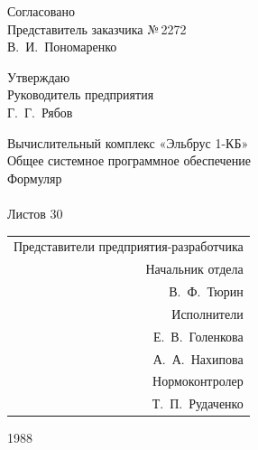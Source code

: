 \documentclass[11pt,a4paper]{article}
\begin{document}
\begin{titlepage}\small
\noindent\begin{minipage}[t]{0.45\linewidth}Согласовано\\Представитель заказчика №\,2272\\В.~И.~Пономаренко\end{minipage}\hfill\begin{minipage}[t]{0.45\linewidth}\raggedleft Утверждаю\\Руководитель предприятия\\Г.~Г.~Рябов\end{minipage}
\vspace*{\fill}\begin{center}
{\large Вычислительный комплекс «Эльбрус 1-КБ»}\\[0.6em]
{\large Общее системное программное обеспечение}\\[0.6em]
{\large Формуляр}\\[0.6em]
\vspace{1em}{\large\bfseries ИЫ.00110-01 30 01}\\[0.4em]
Листов 30\end{center}\vspace*{\fill}
\begin{flushright}\begin{tabular}{r}Представители предприятия-разработчика\\Начальник отдела\\В.~Ф.~Тюрин\\Исполнители\\Е.~В.~Голенкова\\А.~А.~Нахипова\\Нормоконтролер\\Т.~П.~Рудаченко\end{tabular}\end{flushright}
\begin{center}1988\end{center}\end{titlepage}
\tableofcontents\clearpage
\end{document}
